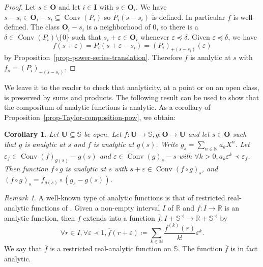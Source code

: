 \documentclass{article}
\newcommand{\assign}{\coloneqq}
\newcommand{\of}{:}
\newcommand{\tmop}[1]{\ensuremath{\operatorname{#1}}}
\newtheorem{corollary}[theorem]{Corollary}
\theoremstyle{remark}\newtheorem*{convention*}{Convention}
\newtheorem{remark}[theorem]{Remark}
\begin{document}
\begin{proof}
  Let $s \in \mathbf{O}$ and let $i \in \mathbf{I}$ with $s \in \mathbf{O}_i$.
  We have $s - s_i \in \mathbf{O}_i - s_i \subseteq \tmop{Conv} (P_i)$ so
  $\widetilde{P_i} (s - s_i)$ is defined. In particular $f$ is well-defined.
  The class $\mathbf{O}_i - s_i$ is a neighborhood of $0$, so there is a
  $\delta \in \tmop{Conv} (P_i) \setminus \{ 0 \}$ such that $s_i +
  \varepsilon \in \mathbf{O}_i$ whenever $\varepsilon \preccurlyeq \delta$.
  Given $\varepsilon \preccurlyeq \delta$, we have
  \[ f (s + \varepsilon) = P_i (s + \varepsilon - s_i) = (P_i)_{+ (s - s_i)}
     (\varepsilon) \]
  by Proposition~\ref{prop-power-series-translation}. Therefore $f$ is
  analytic at $s$ with $f_s = (P_i)_{+ (s - s_i)}$.
\end{proof}

We leave it to the reader to check that analyticity, at a point or on an open
class, is preserved by sums and products. The following result can be used to
show that the compositum of analytic functions is analytic. As a corollary of
Proposition~\ref{prop-Taylor-composition-pow}, we obtain:

\begin{corollary}
  \label{cor-Taylor-composition}Let $\mathbf{U} \subseteq \mathbb{S}$ be open.
  Let $f \of \mathbf{U} \longrightarrow \mathbb{S}, g \of \mathbf{O}
  \longrightarrow \mathbf{U}$ and let $s \in \mathbf{O}$ such that $g$ is
  analytic at $s$ and $f$ is analytic at $g (s)$. Write $g_s = \sum_{n \in
  \mathbb{N}} a_k X^n$. Let $\varepsilon_f \in \tmop{Conv} (f)_{g (s)} - g
  (s)$ and $\varepsilon \in \tmop{Conv} (g)_s - s$ with $\forall k > 0, a_k
  \varepsilon^k \prec \varepsilon_f$. Then function $f \circ g$ is analytic at
  $s$ with $s + \varepsilon \in \tmop{Conv} (f \circ g)_s$, and $(f \circ g)_s
  = f_{g (s)} \circ (g_s - g (s))$.
\end{corollary}

\begin{remark}
  \label{rem-analytic}A well-known type of analytic functions is that of
  restricted real-analytic functions of {\cite{DvdD:an,vdDMM}}. Given a
  non-empty interval $I$ of $\mathbb{R}$ and $f \of I \longrightarrow \mathbb{R}$
  is an analytic function, then $f$ extends into a function $\overline{f} \of
  I +\mathbb{S}^{\prec} \longrightarrow \mathbb{R}+\mathbb{S}^{\prec}$
  by
  \[ \forall r \in I, \forall \varepsilon \prec 1, \overline{f} (r +
     \varepsilon) \assign \sum_{k \in \mathbb{N}} \frac{f^{(k)} (r)}{k!}
     \varepsilon^k . \]
  We say that $\overline{f}$ is a restricted real-analytic function on
  $\mathbb{S}$. The function $\overline{f}$ is in fact analytic.
\end{remark}
\end{document}
